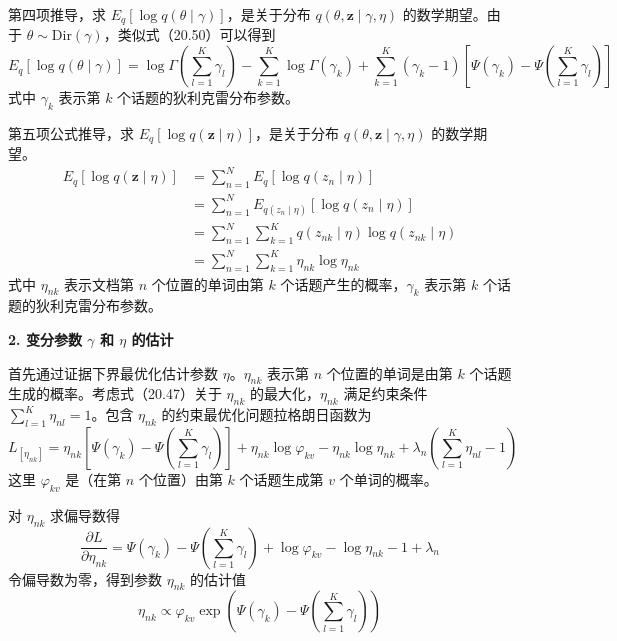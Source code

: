\documentclass[UTF8, 12pt, fontset=fandol, oneside]{ctexart}
\begin{document}
第四项推导，求 $E_q[\log q(\theta\mid\gamma)]$，是关于分布 $q(\theta,\mathbf{z}\mid\gamma,\eta)$ 的数学期望。由于 $\theta\sim\mathrm{Dir}(\gamma)$，类似式（20.50）可以得到
\begin{equation}
E_q[\log q(\theta\mid\gamma)]=\log\Gamma\left(\sum_{l=1}^K\gamma_l\right)-\sum_{k=1}^K\log\Gamma(\gamma_k)+\sum_{k=1}^K(\gamma_k-1)\left[\Psi(\gamma_k)-\Psi\left(\sum_{l=1}^K\gamma_l\right)\right]
\tag{20.54}
\end{equation}
式中 $\gamma_k$ 表示第 $k$ 个话题的狄利克雷分布参数。

第五项公式推导，求 $E_q[\log q(\mathbf{z}\mid\eta)]$，是关于分布 $q(\theta,\mathbf{z}\mid\gamma,\eta)$ 的数学期望。
\begin{equation}
\begin{aligned}
E_q[\log q(\mathbf{z}\mid\eta)]
&=\sum_{n=1}^N E_q[\log q(z_n\mid\eta)]\\
&=\sum_{n=1}^N E_{q(z_n\mid\eta)}[\log q(z_n\mid\eta)]\\
&=\sum_{n=1}^N\sum_{k=1}^K q(z_{nk}\mid\eta)\log q(z_{nk}\mid\eta)\\
&=\sum_{n=1}^N\sum_{k=1}^K \eta_{nk}\log\eta_{nk}
\end{aligned}
\tag{20.55}
\end{equation}
式中 $\eta_{nk}$ 表示文档第 $n$ 个位置的单词由第 $k$ 个话题产生的概率，$\gamma_k$ 表示第 $k$ 个话题的狄利克雷分布参数。

\noindent\textbf{2. 变分参数 $\gamma$ 和 $\eta$ 的估计}

首先通过证据下界最优化估计参数 $\eta$。$\eta_{nk}$ 表示第 $n$ 个位置的单词是由第 $k$ 个话题生成的概率。考虑式（20.47）关于 $\eta_{nk}$ 的最大化，$\eta_{nk}$ 满足约束条件 $\sum_{l=1}^K\eta_{nl}=1$。包含 $\eta_{nk}$ 的约束最优化问题拉格朗日函数为
\begin{equation}
L_{[\eta_{nk}]}=\eta_{nk}\left[\Psi(\gamma_k)-\Psi\left(\sum_{l=1}^K\gamma_l\right)\right]+\eta_{nk}\log\varphi_{kv}-\eta_{nk}\log\eta_{nk}+\lambda_n\left(\sum_{l=1}^K\eta_{nl}-1\right)
\tag{20.56}
\end{equation}
这里 $\varphi_{kv}$ 是（在第 $n$ 个位置）由第 $k$ 个话题生成第 $v$ 个单词的概率。

对 $\eta_{nk}$ 求偏导数得
\begin{equation}
\frac{\partial L}{\partial \eta_{nk}}=\Psi(\gamma_k)-\Psi\left(\sum_{l=1}^K\gamma_l\right)+\log\varphi_{kv}-\log\eta_{nk}-1+\lambda_n
\tag{20.57}
\end{equation}
令偏导数为零，得到参数 $\eta_{nk}$ 的估计值
\begin{equation}
\eta_{nk}\propto \varphi_{kv}\exp\left(\Psi(\gamma_k)-\Psi\left(\sum_{l=1}^K\gamma_l\right)\right)
\tag{20.58}
\end{equation}
\end{document}
